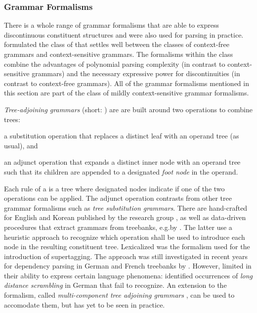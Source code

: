 \documentclass[../document.tex]{subfiles}
\begin{document}
    \subsubsection*{Grammar Formalisms}
    There is a whole range of grammar formalisms that are able to express discontinuous constituent structures and were also used for parsing in practice.
    \citet{VijWeiJos87,Weir88} formulated the class of  that settles well between the classes of context-free grammars and context-sensitive grammars.
    The formalisms within the class combine the advantages of polynomial parsing complexity (in contrast to context-sensitive grammars) and the necessary expressive power for discontinuities (in contrast to context-free grammars).
    All of the grammar formalisms mentioned in this section are part of the class of mildly context-sensitive grammar formalisms.

    \emph{Tree-adjoining grammars} (short: ) \citep{JosLevTak75} are are built around two operations to combine trees:
    \begin{compactitem}
        \item a substitution operation that replaces a distinct leaf with an operand tree (as usual), and
        \item an adjunct operation that expands a distinct inner node with an operand tree such that its children are appended to a designated \emph{foot node} in the operand.
    \end{compactitem}
    Each rule of a  is a tree where designated nodes indicate if one of the two operations can be applied.
    The adjunct operation contrasts  from other tree grammar formalisms such as \emph{tree substitution grammars}.
    There are hand-crafted  for English \citep{xtag01} and Korean \citep{xtag02} published by the  research group \citep{Anoop00}, as well as data-driven procedures that extract grammars from treebanks, e.g.\@ by \citet{xia1999extracting,Bla18}.
    The latter use a heuristic approach to recognize which operation shall be used to introduce each node in the resulting constituent tree.
    Lexicalized  was the formalism used for the introduction of supertagging. \citep{bangalore1999supertagging}
    The approach was still investigated in recent years for dependency parsing in German and French treebanks by \citet{Kas17,Bla18}.
    However,  limited in their ability to express certain language phenomena: \citet{Becker91} identified occurrences of \emph{long distance scrambling} in German that  fail to recognize.
    An extension to the formalism, called \emph{multi-component tree adjoining grammars} \citep{VijWeiJos87,Weir88}, can be used to accomodate them, but has yet to be seen in practice.
\end{document}
